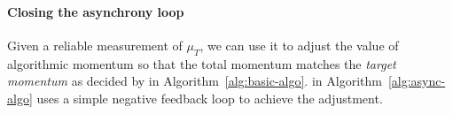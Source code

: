 \paragraph{Closing the asynchrony loop}
Given a reliable measurement of $\mu_{T}$, 
we can use it to adjust the value of algorithmic momentum so that the total momentum matches the \emph{target momentum} as decided by \tuner in Algorithm~\ref{alg:basic-algo}.
\Asynctuner in Algorithm~\ref{alg:async-algo} %
uses a simple negative feedback loop to achieve the adjustment.





